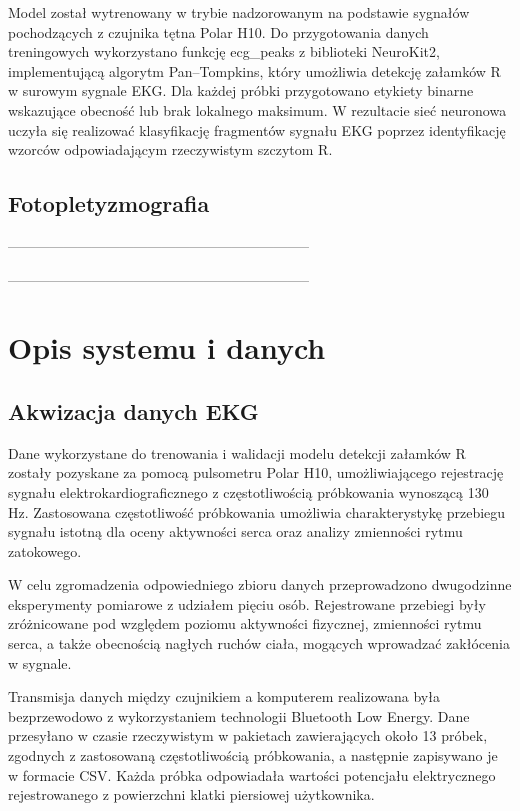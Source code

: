 \documentclass[journal]{IEEEtran}
\begin{document}
Model został wytrenowany w trybie nadzorowanym na podstawie sygnałów pochodzących z czujnika tętna Polar H10. Do przygotowania danych treningowych wykorzystano funkcję ecg\_peaks z biblioteki NeuroKit2, implementującą algorytm Pan–Tompkins, który umożliwia detekcję załamków R w surowym sygnale EKG. Dla każdej próbki przygotowano etykiety binarne wskazujące obecność lub brak lokalnego maksimum. W rezultacie sieć neuronowa uczyła się realizować klasyfikację fragmentów sygnału EKG poprzez identyfikację wzorców odpowiadającym rzeczywistym szczytom R.


\subsection{Fotopletyzmografia}
-----------------------------------------------------------------

-----------------------------------------------------------------

\newpage
\section{Opis systemu i danych}

\subsection{Akwizacja danych EKG}
Dane wykorzystane do trenowania i walidacji modelu detekcji załamków R zostały pozyskane za pomocą pulsometru Polar H10, umożliwiającego rejestrację sygnału elektrokardiograficznego z częstotliwością próbkowania wynoszącą 130 Hz. Zastosowana częstotliwość próbkowania umożliwia charakterystykę przebiegu sygnału istotną dla oceny aktywności serca oraz analizy zmienności rytmu zatokowego.

W celu zgromadzenia odpowiedniego zbioru danych przeprowadzono dwugodzinne eksperymenty pomiarowe z udziałem pięciu osób. Rejestrowane przebiegi były zróżnicowane pod względem poziomu aktywności fizycznej, zmienności rytmu serca, a także obecnością nagłych ruchów ciała, mogących wprowadzać zakłócenia w sygnale.

Transmisja danych między czujnikiem a komputerem realizowana była bezprzewodowo z wykorzystaniem technologii Bluetooth Low Energy. Dane przesyłano w czasie rzeczywistym w pakietach zawierających około 13 próbek, zgodnych z zastosowaną częstotliwością próbkowania, a następnie zapisywano je w formacie CSV. Każda próbka odpowiadała wartości potencjału elektrycznego rejestrowanego z powierzchni klatki piersiowej użytkownika.
\end{document}
